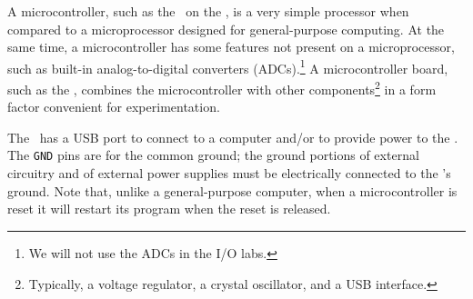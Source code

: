 


A microcontroller, such as the \microcontrollerreference\ on the \developmentboard, is a very simple processor when compared to a microprocessor designed for general-purpose computing.
At the same time, a microcontroller has some features not present on a microprocessor, such as built-in analog-to-digital converters (ADCs).\footnote{We will not use the ADCs in the I/O labs.} A microcontroller board, such as the \developmentboard, combines the microcontroller with other components\footnote{Typically, a voltage regulator, a crystal oscillator, and a USB interface.} in a form factor convenient for experimentation.

The \developmentboard\ has a USB port to connect to a computer and/or to provide power to the \developmentboard.
\icspdescription
\pindescription
\usartdescription
\digitalpindescription
\analogpindescription
\regulatedvoltagedescription
\unregulatedvoltagedescription
The \texttt{GND} pins are for the common ground;
the ground portions of external circuitry and of external power supplies must be electrically connected to the \developmentboard's ground.
\resetdescription
Note that, unlike a general-purpose computer, when a microcontroller is reset it will restart its program when the reset is released.

